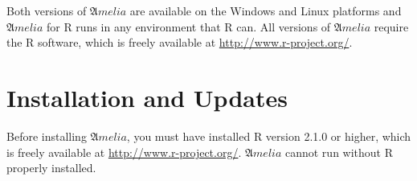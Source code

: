 \documentclass[12pt,titlepage]{article}
\newcommand{\Amelia}{\ensuremath{\mathfrak Amelia} }
\begin{document}
Both versions of \Amelia are available on the Windows and Linux platforms and \Amelia for R runs in any environment that R can.  All versions of ${\mathfrak Amelia}$ require the R software, which is freely available at \url{http://www.r-project.org/}.


\section{Installation and Updates}
\label{sec:install}

Before installing ${\mathfrak Amelia}$, you must have installed R version 2.1.0 or higher, which is freely available at \url{http://www.r-project.org/}.  ${\mathfrak Amelia}$ cannot run without R properly installed. 
\end{document}
